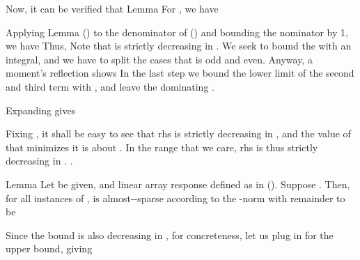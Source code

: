 Now, it can be verified that
\Result
{Lemma}
{
For , we have
}

Applying Lemma () to the denominator of () and bounding the nominator by 1, we have
Thus,
Note that  is strictly decreasing in .
We seek to bound the  with an integral, and we have to split the cases that  is odd and even.
Anyway, a moment's reflection shows
In the last step we bound the lower limit of the second and third term with , and leave the dominating .

Expanding  gives

Fixing , it shall be easy to see that rhs is strictly decreasing in , and the value of  that minimizes it is about .
In the range that we care, rhs is thus strictly decreasing in .
.

\Result
{Lemma}
{
Let  be given, and linear array response  defined as in ().
Suppose .
Then, for all instances of \m {\f},  is almost--sparse according to the -norm with remainder  to be
}

Since the bound is also decreasing in , for concreteness, let us plug in  for the upper bound, giving

\stopsection

\startsection [title={Almost-Sparsity of \m {\M{G}}}]

